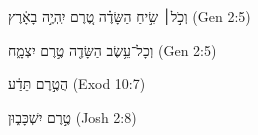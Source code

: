
\begin{exe}

\ex\label{ant_VRM_exs1}
\texthebrew{
וְכֹ֣ל׀ שִׂ֣יחַ הַשָּׂדֶ֗ה טֶ֚רֶם יִֽהְיֶ֣ה בָאָ֔רֶץ 
} (Gen 2:5)

\ex\label{ant_VRM_exs2}
\texthebrew{
וְכָל־עֵ֥שֶׂב הַשָּׂדֶ֖ה טֶ֣רֶם יִצְמָ֑ח 
} (Gen 2:5)

\ex\label{ant_VRM_exs3}
\texthebrew{
הֲטֶ֣רֶם תֵּדַ֔ע 
} (Exod 10:7)

\ex\label{ant_VRM_exs4}
\texthebrew{
טֶ֣רֶם יִשְׁכָּב֑וּן 
} (Josh 2:8)

\end{exe}
